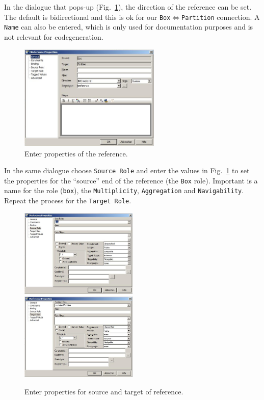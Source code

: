 In the dialogue that pops-up (Fig.~\ref{fig:ereference_properties}), the
direction of the reference can be set.  The default is bidirectional and this is
ok for our \texttt{Box}$\Leftrightarrow$\texttt{Partition} connection.
A \texttt{Name} can also be entered, which is only used for documentation
purposes and is not relevant for codegeneration.

\begin{figure}[htbp]
	\centering
  \includegraphics[width=0.6\textwidth]{pics/memBox25.png}
	\caption{Enter properties of the reference.}
	\label{fig:ereference_properties}
\end{figure}
	
\clearpage

In the same dialogue choose \texttt{Source Role} and enter the values in
Fig.~\ref{fig:ereference_properties} to set the properties for the ``source''
end of the reference (the \texttt{Box} role).  Important is a name for the role
(\texttt{box}), the \texttt{Multiplicity}, \texttt{Aggregation} and
\texttt{Navigability}.  Repeat the process for the \texttt{Target Role}.
  
\begin{figure}[htbp]
	\centering
  \includegraphics[width=0.5\textwidth]{pics/memBox26.png}\\
  \vspace{0.5cm}
  \includegraphics[width=0.5\textwidth]{pics/memBox27.png}
	\caption{Enter properties for source and target of reference.}
	\label{fig:reference_ends}
\end{figure}

